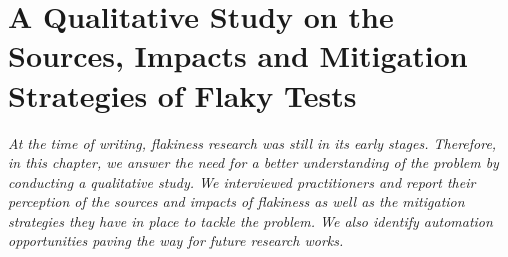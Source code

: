 \chapter{A Qualitative Study on the Sources, Impacts and Mitigation Strategies of Flaky Tests}
\label{chap:survey}

\setcounter{minitocdepth}{1}
\justifying
\textit{At the time of writing, flakiness research was still in its early stages. Therefore, in this chapter, we answer the need for a better understanding of the problem by conducting a qualitative study. We interviewed practitioners and report their perception of the sources and impacts of flakiness as well as the mitigation strategies they have in place to tackle the problem. We also identify automation opportunities paving the way for future research works.} \\








